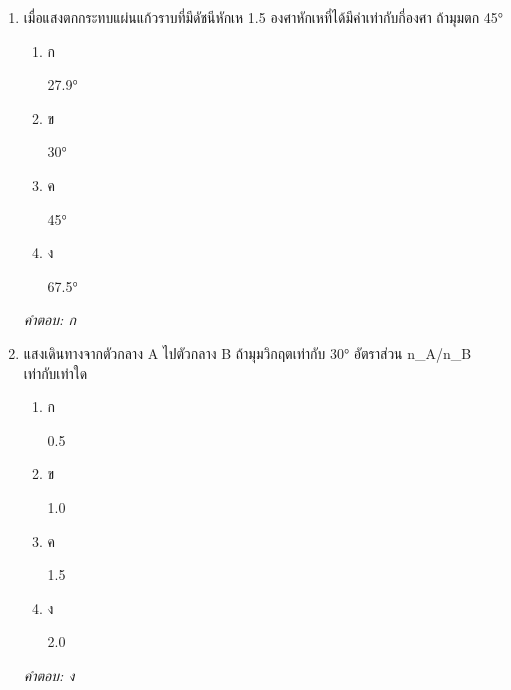 \documentclass[12pt]{article}
\begin{document}
\begin{enumerate}[label=\arabic*., itemsep=0.5\baselineskip, topsep=0.5\baselineskip, leftmargin=*]
\item เมื่อแสงตกกระทบแผ่นแก้วราบที่มีดัชนีหักเห 1.5 องศาหักเหที่ได้มีค่าเท่ากับกี่องศา ถ้ามุมตก 45°
\begin{enumerate}[label=\alph*)., itemsep=0.3\baselineskip, topsep=0.3\baselineskip]
\item ก\ 
\begin{minipage}[t]{0.9\linewidth}
\raggedright 27.9°
\end{minipage}
\item ข\ 
\begin{minipage}[t]{0.9\linewidth}
\raggedright 30°
\end{minipage}
\item ค\ 
\begin{minipage}[t]{0.9\linewidth}
\raggedright 45°
\end{minipage}
\item ง\ 
\begin{minipage}[t]{0.9\linewidth}
\raggedright 67.5°
\end{minipage}
\end{enumerate}
\vspace{-0.3\baselineskip}
\begin{small}
\textit{คำตอบ: ก}
\end{small}

\item แสงเดินทางจากตัวกลาง A ไปตัวกลาง B ถ้ามุมวิกฤตเท่ากับ 30° อัตราส่วน n\_A/n\_B เท่ากับเท่าใด
\begin{enumerate}[label=\alph*)., itemsep=0.3\baselineskip, topsep=0.3\baselineskip]
\item ก\ 
\begin{minipage}[t]{0.9\linewidth}
\raggedright 0.5
\end{minipage}
\item ข\ 
\begin{minipage}[t]{0.9\linewidth}
\raggedright 1.0
\end{minipage}
\item ค\ 
\begin{minipage}[t]{0.9\linewidth}
\raggedright 1.5
\end{minipage}
\item ง\ 
\begin{minipage}[t]{0.9\linewidth}
\raggedright 2.0
\end{minipage}
\end{enumerate}
\vspace{-0.3\baselineskip}
\begin{small}
\textit{คำตอบ: ง}
\end{small}


\end{enumerate}
\end{document}
